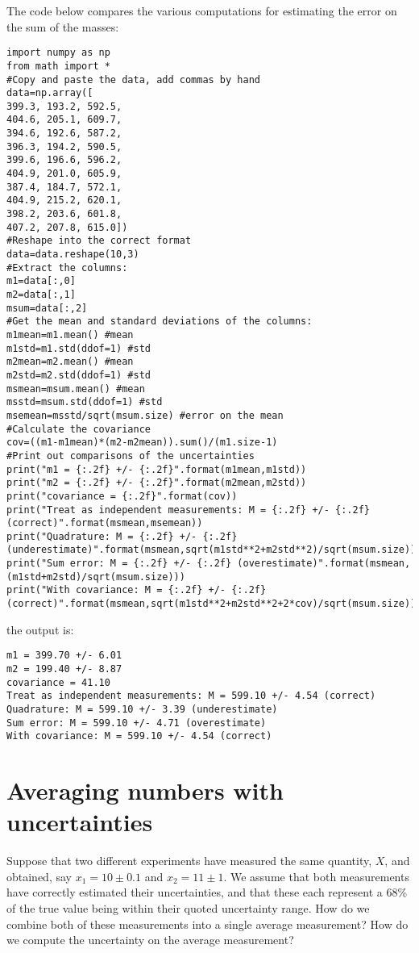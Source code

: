 The code below compares the various computations for estimating the error on the sum of the masses:
\begin{lstlisting}[frame=single] 
import numpy as np
from math import *
#Copy and paste the data, add commas by hand
data=np.array([
399.3, 193.2, 592.5,
404.6, 205.1, 609.7,
394.6, 192.6, 587.2,
396.3, 194.2, 590.5,
399.6, 196.6, 596.2,
404.9, 201.0, 605.9,
387.4, 184.7, 572.1,
404.9, 215.2, 620.1,
398.2, 203.6, 601.8,
407.2, 207.8, 615.0])
#Reshape into the correct format
data=data.reshape(10,3)
#Extract the columns:
m1=data[:,0]
m2=data[:,1]
msum=data[:,2]
#Get the mean and standard deviations of the columns:
m1mean=m1.mean() #mean
m1std=m1.std(ddof=1) #std
m2mean=m2.mean() #mean
m2std=m2.std(ddof=1) #std
msmean=msum.mean() #mean
msstd=msum.std(ddof=1) #std
msemean=msstd/sqrt(msum.size) #error on the mean
#Calculate the covariance
cov=((m1-m1mean)*(m2-m2mean)).sum()/(m1.size-1)
#Print out comparisons of the uncertainties
print("m1 = {:.2f} +/- {:.2f}".format(m1mean,m1std))
print("m2 = {:.2f} +/- {:.2f}".format(m2mean,m2std))
print("covariance = {:.2f}".format(cov))
print("Treat as independent measurements: M = {:.2f} +/- {:.2f} (correct)".format(msmean,msemean))
print("Quadrature: M = {:.2f} +/- {:.2f} (underestimate)".format(msmean,sqrt(m1std**2+m2std**2)/sqrt(msum.size)))
print("Sum error: M = {:.2f} +/- {:.2f} (overestimate)".format(msmean,(m1std+m2std)/sqrt(msum.size)))
print("With covariance: M = {:.2f} +/- {:.2f} (correct)".format(msmean,sqrt(m1std**2+m2std**2+2*cov)/sqrt(msum.size)))
\end{lstlisting}
the output is:
\begin{verbatim}
m1 = 399.70 +/- 6.01
m2 = 199.40 +/- 8.87
covariance = 41.10
Treat as independent measurements: M = 599.10 +/- 4.54 (correct)
Quadrature: M = 599.10 +/- 3.39 (underestimate)
Sum error: M = 599.10 +/- 4.71 (overestimate)
With covariance: M = 599.10 +/- 4.54 (correct)
\end{verbatim}



\section{Averaging numbers with uncertainties}
Suppose that two different experiments have measured the same quantity, $X$, and obtained, say $x_1=10 \pm 0.1$ and $x_2=11 \pm 1$. We assume that both measurements have correctly estimated their uncertainties, and that these each represent a 68\% of the true value being within their quoted uncertainty range. How do we combine both of these measurements into a single average measurement? How do we compute the uncertainty on the average measurement?

